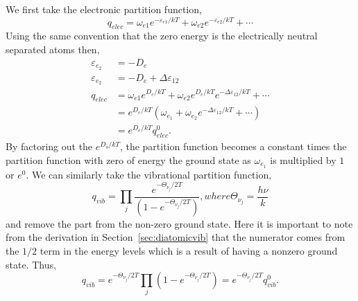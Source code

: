 We first take the electronic partition function,
\begin{equation*}
	q_{elec} = \omega_{e1} e^{-\varepsilon_{e1}/kT} + \omega_{e2}
	e^{-\varepsilon_{e2}/kT} + \cdots
\end{equation*}
Using the same convention that the zero energy is the electrically neutral
separated atoms then,
\begin{align*}
	\varepsilon_{e_2} &= -D_e \\
	\varepsilon_{e_2} &= -D_e + \Delta\varepsilon_{12} \\
	q_{elec} &= \omega_{e1} e^{D_e/kT} + \omega_{e2}
	e^{D_e/kT}e^{-\Delta\varepsilon_{12}/kT} + \cdots \\
			 &= e^{D_{e}/kT} (\omega_{e_{1}} + \omega_{e_2}
			 e^{-\Delta\varepsilon_{12}/kT} + \cdots) \\
			 &= e^{D_e/kT} q_{elec}^0.
\end{align*}
By factoring out the $e^{D_{o}/kT}$, the partition function becomes a constant
times the partition function with zero of energy the ground state as
$\omega_{e_{1}}$ is multiplied by $1$ or $e^0$. We can similarly take the
vibrational partition function,
\begin{equation*}
	q_{vib} = \prod_{j}{\frac{e^{-\Theta_{\nu_{j}}/2T}}
	{(1 - e^{-\Theta_{\nu_{j}}/2T})}}, where \Theta_{\nu_j} = \frac{h\nu}{k}
\end{equation*}
and remove the part from the non-zero ground state. Here it is important to note
from the derivation in Section~\ref{sec:diatomicvib} that the numerator comes
from the $1 /2$ term in the energy levels which is a result of having a nonzero
ground state. Thus,
\begin{equation*}
	q_{vib} = e^{-\Theta_{\nu_{j}}/2T}\prod_{j}{(1 - e^{-\Theta_{\nu_{j}}/2T})}
	= e^{-\Theta_{\nu_{j}}/2T} q_{vib}^0.
\end{equation*}

